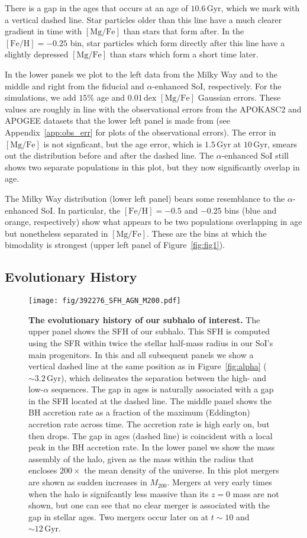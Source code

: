 \documentclass[linenumbers, twocolumn]{aastex631}
\newcommand{\Gyr}{\ensuremath{\textrm{Gyr}}}
\newcommand{\FeH}{\ensuremath{[\textrm{Fe}/\textrm{H}]}}
\newcommand{\MgFe}{\ensuremath{[\textrm{Mg}/\textrm{Fe}]}}
\newcommand{\dex}{\ensuremath{\textrm{dex}}}
\begin{document}
There is a gap in the ages that occurs at an age of $10.6\,\Gyr$, which we mark with a vertical dashed line. Star particles older than this line have a much clearer gradient in time with \MgFe{} than stars that form after. In the $\FeH=-0.25$ bin, star particles which form directly after this line have a slightly depressed \MgFe{} than stars which form a short time later.

In the lower panels we plot to the left data from the Milky Way and to the middle and right from the fiducial and $\alpha$-enhanced SoI, respectively. For the simulations, we add $15\%$ age and $0.01\,\dex$ \MgFe{} Gaussian errors. These values are roughly in line with the observational errors from the APOKASC2 and APOGEE datasets that the lower left panel is made from (see Appendix~\ref{app:obs_err} for plots of the observational errors). The error in \MgFe{} is not signficant, but the age error, which is $1.5\,\Gyr$ at $10\,\Gyr$, smears out the distribution before and after the dashed line. The $\alpha$-enhanced SoI still shows two separate populations in this plot, but they now significantly overlap in age.

The Milky Way distribution (lower left panel) bears some resemblance to the $\alpha$-enhanced SoI. In particular, the $\FeH=-0.5$ and $-0.25$ bins (blue and orange, respectively) show what appears to be two populations overlapping in age but nonetheless separated in \MgFe{}. These are the bins at which the bimodality is strongest (upper left panel of Figure~\ref{fig:fig1}).

\subsection{Evolutionary History}\label{ssec:evol}

\begin{figure}
  \centering
  \texttt{[image: fig/392276\_SFH\_AGN\_M200.pdf]}
  \caption{\textbf{The evolutionary history of our subhalo of interest.} The upper panel shows the SFH of our subhalo. This SFH is computed using the SFR within twice the stellar half-mass radius in our SoI's main progenitors. In this and all subsequent panels we show a vertical dashed line at the same position as in Figure~\ref{fig:alpha} ($\sim3.2\,\Gyr$), which delineates the separation between the high- and low-$\alpha$ sequences. The gap in ages is naturally associated with a gap in the SFH located at the dashed line. The middle panel shows the BH accretion rate as a fraction of the maximum (Eddington) accretion rate across time. The accretion rate is high early on, but then drops. The gap in ages (dashed line) is coincident with a local peak in the BH accretion rate. In the lower panel we show the mass assembly of the halo, given as the mass within the radius that encloses $200\times$ the mean density of the universe. In this plot mergers are shown as sudden increases in $M_{200}$. Mergers at very early times when the halo is signifcantly less massive than its $z=0$ mass are not shown, but one can see that no clear merger is associated with the gap in stellar ages. Two mergers occur later on at $t\sim10$ and $\sim12\,\Gyr$.}
  \label{fig:history}
\end{figure}
\end{document}
